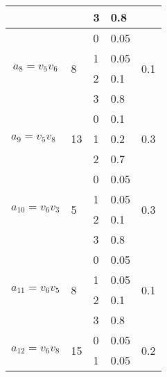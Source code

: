 \begin{longtable}[!ht]{lllll}
		\multicolumn{1}{c}{}                               &                     & 3  & 0.8  &                      \\ \hline
		\multicolumn{1}{c}{\multirow{4}{*}{$a_8=v_5 v_6$}} & \multirow{4}{*}{8} & 0  & 0.05 & \multirow{4}{*}{0.1} \\
		\multicolumn{1}{c}{}                               &                     & 1  & 0.05 &                      \\
		\multicolumn{1}{c}{}                               &                     & 2  & 0.1  &                      \\
		\multicolumn{1}{c}{}                               &                     & 3  & 0.8  &                      \\ \hline
		\multirow{3}{*}{$a_9=v_5 v_8$}                     & \multirow{3}{*}{13}  & 0  & 0.1  & \multirow{3}{*}{0.3} \\
		&                     & 1  & 0.2  &                      \\
		&                     & 2  & 0.7  &                      \\ \hline
		\multicolumn{1}{c}{\multirow{4}{*}{$a_{10}=v_6 v_3$}} & \multirow{4}{*}{5} & 0  & 0.05 & \multirow{4}{*}{0.3} \\
		\multicolumn{1}{c}{}                               &                     & 1  & 0.05 &                      \\
		\multicolumn{1}{c}{}                               &                     & 2  & 0.1  &                      \\
		\multicolumn{1}{c}{}                               &                     & 3  & 0.8  &                      \\ \hline
		\multicolumn{1}{c}{\multirow{4}{*}{$a_{11}=v_6 v_5$}} & \multirow{4}{*}{8} & 0  & 0.05 & \multirow{4}{*}{0.1} \\
		\multicolumn{1}{c}{}                               &                     & 1  & 0.05 &                      \\
		\multicolumn{1}{c}{}                               &                     & 2  & 0.1  &                      \\
		\multicolumn{1}{c}{}                               &                     & 3  & 0.8  &                      \\ \hline
		\multicolumn{1}{c}{\multirow{4}{*}{$a_{12}=v_6 v_8$}} & \multirow{4}{*}{15} & 0  & 0.05 & \multirow{4}{*}{0.2} \\
		\multicolumn{1}{c}{}                               &                     & 1  & 0.05 &                      \\

\end{longtable}
